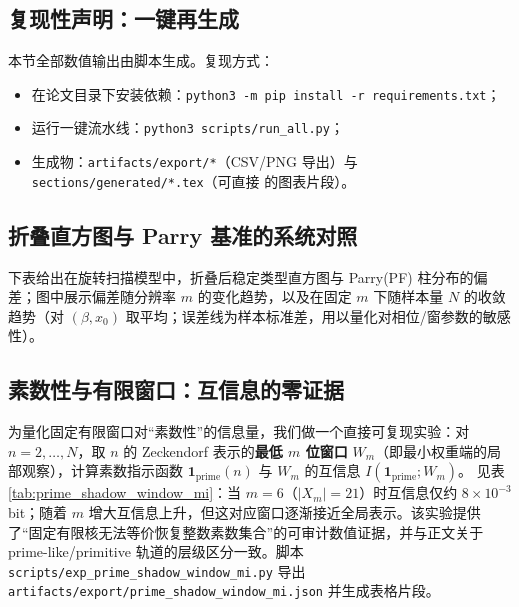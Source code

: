 \subsection{复现性声明：一键再生成}

本节全部数值输出由脚本生成。复现方式：
\begin{itemize}
  \item 在论文目录下安装依赖：\verb|python3 -m pip install -r requirements.txt|；
  \item 运行一键流水线：\verb|python3 scripts/run_all.py|；
  \item 生成物：\verb|artifacts/export/*|（CSV/PNG 导出）与 \verb|sections/generated/*.tex|（可直接 \verb|| 的图表片段）。
\end{itemize}

\subsection{折叠直方图与 Parry 基准的系统对照}

下表给出在旋转扫描模型中，折叠后稳定类型直方图与 Parry(PF) 柱分布的偏差；图中展示偏差随分辨率 $m$ 的变化趋势，以及在固定 $m$ 下随样本量 $N$ 的收敛趋势（对 $(\beta,x_0)$ 取平均；误差线为样本标准差，用以量化对相位/窗参数的敏感性）。







\subsection{素数性与有限窗口：互信息的零证据}\label{subsec:prime-shadow-window-mi}
为量化固定有限窗口对“素数性”的信息量，我们做一个直接可复现实验：对 $n=2,\dots,N$，取 $n$ 的 Zeckendorf 表示的\textbf{最低 $m$ 位窗口} $W_m$（即最小权重端的局部观察），计算素数指示函数 $\mathbf{1}_{\mathrm{prime}}(n)$ 与 $W_m$ 的互信息
\(
I(\mathbf{1}_{\mathrm{prime}};W_m)
\)。
见表 \ref{tab:prime_shadow_window_mi}：当 $m=6$（$|X_m|=21$）时互信息仅约 $8\times 10^{-3}$ bit；随着 $m$ 增大互信息上升，但这对应窗口逐渐接近全局表示。该实验提供了“固定有限核无法等价恢复整数素数集合”的可审计数值证据，并与正文关于 prime-like/primitive 轨道的层级区分一致。脚本 \texttt{scripts/exp\_prime\_shadow\_window\_mi.py} 导出 \texttt{artifacts/export/prime\_shadow\_window\_mi.json} 并生成表格片段。

